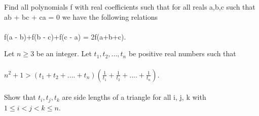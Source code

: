 



\item Find all polynomials f with real coefficients such that for all reals a,b,c such that ab + bc + ca = 0 we have the following relations\\
\\ f(a - b)+f(b - c)+f(c - a) = 2f(a+b+c).\\

\item Let $n \geq 3$ be an integer. Let $t_1, t_2, ..., t_n$ be positive real numbers such that\\
\\ $n^2+1 > (t_1 + t_2 +....+t_n) (\frac{1}{t_1} + \frac{1}{t_2}
+....+ \frac{1}{t_n})$.\\
\\ Show that $t_i, t_j, t_k$ are side lengths of a triangle for all i, j, k with
$1 \leq i < j < k \leq n$.

